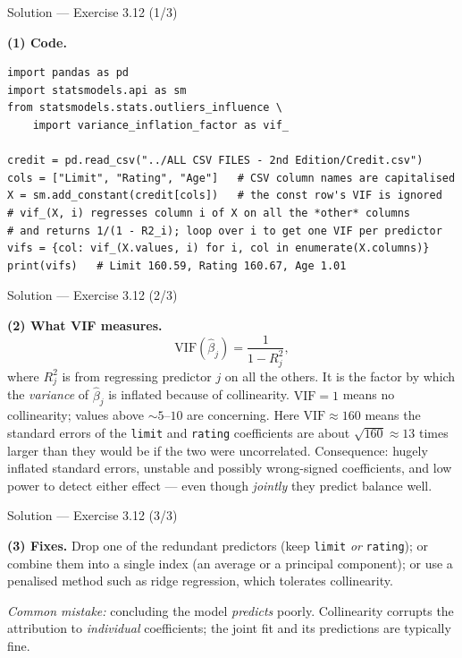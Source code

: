 \documentclass[aspectratio=169,11pt]{beamer}
\begin{document}
\begin{frame}[fragile]{Solution --- Exercise 3.12 (1/3)}
  \begin{solutionbox}
    \textbf{(1) Code.}
\begin{lstlisting}
import pandas as pd
import statsmodels.api as sm
from statsmodels.stats.outliers_influence \
    import variance_inflation_factor as vif_

credit = pd.read_csv("../ALL CSV FILES - 2nd Edition/Credit.csv")
cols = ["Limit", "Rating", "Age"]   # CSV column names are capitalised
X = sm.add_constant(credit[cols])   # the const row's VIF is ignored
# vif_(X, i) regresses column i of X on all the *other* columns
# and returns 1/(1 - R2_i); loop over i to get one VIF per predictor
vifs = {col: vif_(X.values, i) for i, col in enumerate(X.columns)}
print(vifs)   # Limit 160.59, Rating 160.67, Age 1.01
\end{lstlisting}
  \end{solutionbox}
\end{frame}

\begin{frame}{Solution --- Exercise 3.12 (2/3)}
  \begin{solutionbox}
    \textbf{(2) What VIF measures.}
    \[
      \mathrm{VIF}(\hat\beta_j)=\frac{1}{1-R_j^2},
    \]
    where $R_j^2$ is from regressing predictor $j$ on all the others. It
    is the factor by which the \emph{variance} of $\hat\beta_j$ is
    inflated because of collinearity. $\mathrm{VIF}=1$ means no
    collinearity; values above $\sim5$--$10$ are concerning. Here
    $\mathrm{VIF}\approx 160$ means the standard errors of the
    \texttt{limit} and \texttt{rating} coefficients are about
    $\sqrt{160}\approx 13$ times larger than they would be if the two
    were uncorrelated. Consequence: hugely inflated standard errors,
    unstable and possibly wrong-signed coefficients, and low power to
    detect either effect --- even though \emph{jointly} they predict
    balance well.
  \end{solutionbox}
\end{frame}

\begin{frame}{Solution --- Exercise 3.12 (3/3)}
  \begin{solutionbox}
    \textbf{(3) Fixes.} Drop one of the redundant predictors (keep
    \texttt{limit} \emph{or} \texttt{rating}); or combine them into a single
    index (an average or a principal component); or use a penalised method
    such as ridge regression, which tolerates collinearity.

    \medskip
    \textit{Common mistake:} concluding the model \emph{predicts} poorly.
    Collinearity corrupts the attribution to \emph{individual} coefficients;
    the joint fit and its predictions are typically fine.
  \end{solutionbox}
\end{frame}
\end{document}
